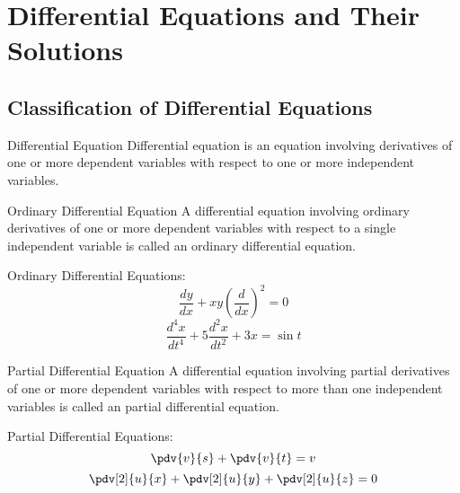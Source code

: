 
\section{Differential Equations and Their Solutions}


\subsection{Classification of Differential Equations}

\begin{definition}{Differential Equation}{}
    Differential equation is an equation involving derivatives of one or more dependent variables with respect to one or more independent variables.
\end{definition}

\begin{definition}{Ordinary Differential Equation}{}
    A differential equation involving ordinary derivatives of one or more dependent variables with respect to a single independent variable is called an ordinary differential equation.
\end{definition}

\begin{example}{Ordinary Differential Equations:}{}
    \begin{equation}
        \frac{dy}{dx} + xy \left( \frac{d}{dx} \right)^2 = 0
    \end{equation}
    \begin{equation}
        \frac{d^4 x}{dt^4} + 5 \frac{d^2 x}{dt^2} + 3x = \sin{t}
    \end{equation}
\end{example}

\begin{definition}{Partial Differential Equation}{}
    A differential equation involving partial derivatives of one or more dependent variables with respect to more than one independent variables is called an partial differential equation.
\end{definition}
\begin{example}{Partial Differential Equations:}{}
    \begin{equation}
        \pdv{v}{s} + \pdv{v}{t} = v
    \end{equation}
    \begin{equation}
        \pdv[2]{u}{x} + \pdv[2]{u}{y} + \pdv[2]{u}{z} = 0
    \end{equation}
\end{example}

